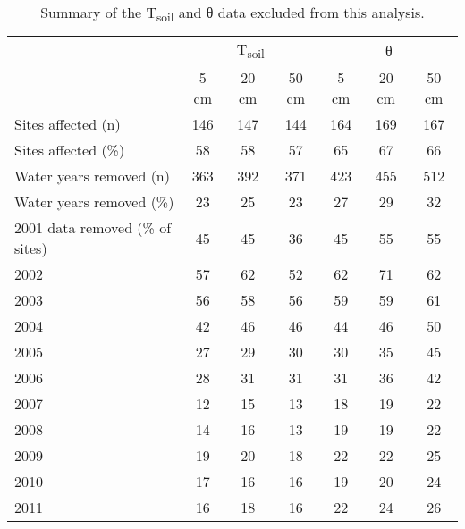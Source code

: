 \begin{table}[ht]
\centering

\caption{Summary of the T\textsubscript{soil} and θ data excluded from this analysis.\label{excluded_data_t}}

\begin{tabular}{lcccccc}
  \toprule
  {} & \multicolumn{3}{c}{T\textsubscript{soil}} & \multicolumn{3}{c}{θ}\\
  \cmidrule(l){2-4} \cmidrule(l){5-7}

 & 5 cm & 20 cm & 50 cm & 5 cm & 20 cm & 50 cm \\ 
  \midrule
Sites affected (n) & 146 & 147 & 144 & 164 & 169 & 167 \\ 
  Sites affected (\%) & 58 & 58 & 57 & 65 & 67 & 66 \\ 
  Water years removed (n) & 363 & 392 & 371 & 423 & 455 & 512 \\ 
  Water years removed (\%) & 23 & 25 & 23 & 27 & 29 & 32 \\ 
  2001 data removed (\% of sites) & 45 & 45 & 36 & 45 & 55 & 55 \\ 
  2002 & 57 & 62 & 52 & 62 & 71 & 62 \\ 
  2003 & 56 & 58 & 56 & 59 & 59 & 61 \\ 
  2004 & 42 & 46 & 46 & 44 & 46 & 50 \\ 
  2005 & 27 & 29 & 30 & 30 & 35 & 45 \\ 
  2006 & 28 & 31 & 31 & 31 & 36 & 42 \\ 
  2007 & 12 & 15 & 13 & 18 & 19 & 22 \\ 
  2008 & 14 & 16 & 13 & 19 & 19 & 22 \\ 
  2009 & 19 & 20 & 18 & 22 & 22 & 25 \\ 
  2010 & 17 & 16 & 16 & 19 & 20 & 24 \\ 
  2011 & 16 & 18 & 16 & 22 & 24 & 26 \\ 
   \bottomrule
\end{tabular}
\end{table}
